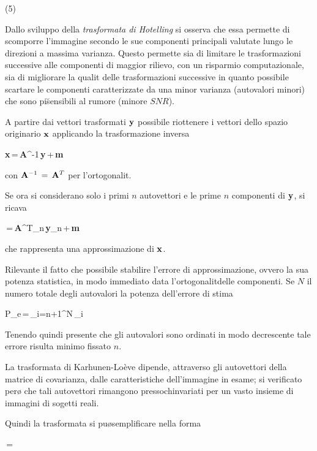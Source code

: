 \vs(5)

Dallo sviluppo della {\it trasformata di Hotelling} si osserva che essa permette
di scomporre l'immagine secondo le sue componenti principali valutate lungo
le direzioni a massima varianza.
Questo permette sia di limitare le trasformazioni successive alle componenti di
maggior rilievo, con un risparmio computazionale, sia di migliorare la qualit\a
delle trasformazioni successive in quanto \e possibile scartare le componenti
caratterizzate da una minor varianza (autovalori minori) che sono pi\u sensibili
al rumore (minore $SNR$).

A partire dai vettori trasformati ${\bf y}$ \e possibile riottenere i vettori
dello spazio originario ${\bf x}$ applicando la trasformazione inversa 

\be
{\bf x}\,=\,{\bf A}^{-1}\,{\bf y}\,+\,{\bf m}
\ee

con ${\bf A}^{-1}\,=\,{\bf A}^T$ per l'ortogonalit\a.

Se ora si considerano solo i primi $n$ autovettori e le prime $n$ componenti di ${\bf y}$,
si ricava

\be
{}\,=\,{\bf A}^T_n\,{\bf y}_n\,+\,{\bf m}
\ee

che rappresenta una approssimazione di ${\bf x}$.

Rilevante \e il fatto che \e possibile stabilire l'errore di approssimazione, ovvero 
la sua potenza statistica, in modo immediato data l'ortogonalit\a delle componenti.
Se $N$ \e il numero totale degli autovalori la potenza dell'errore di stima

\be
P_e\,=\,\sum_{i=n+1}^{N}\,\lambda_i
\ee

Tenendo quindi presente che gli autovalori sono ordinati in modo decrescente tale errore
risulta minimo fissato $n$.

\boss
La trasformata di Karhunen-Lo\`eve dipende, attraverso gli
autovettori della matrice di covarianza, dalle caratteristiche dell'immagine
in esame; si \e verificato per\o \cite{Ohta} che tali autovettori rimangono
pressoch\e invariati per un vasto insieme di immagini di sogetti reali.
\eoss

Quindi la trasformata si pu\o semplificare nella forma

\be
{} 
\,=\,
\,
\ee  

